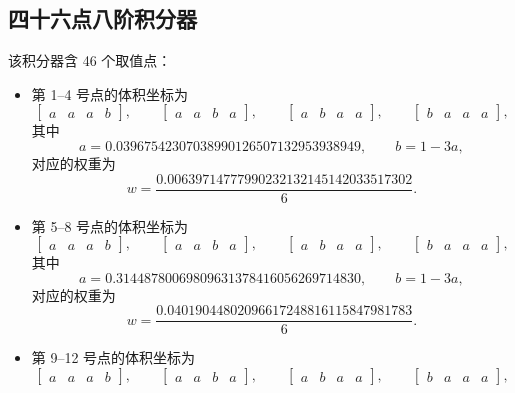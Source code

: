\subsection{四十六点八阶积分器}

该积分器含 46 个取值点：
\begin{itemize}[wide]
\item 第 1–4 号点的体积坐标为
\begin{equation}
\begin{bmatrix}a & a & a & b\end{bmatrix},\qquad\begin{bmatrix}a & a & b & a\end{bmatrix},\qquad\begin{bmatrix}a & b & a & a\end{bmatrix},\qquad\begin{bmatrix}b & a & a & a\end{bmatrix},
\end{equation}
其中
\begin{equation}
a=0.03967542307038990126507132953938949,\qquad b=1-3a,
\end{equation}
对应的权重为
\begin{equation}
w=\frac{0.00639714777990232132145142033517302}{6}.
\end{equation}
\item 第 5–8 号点的体积坐标为
\begin{equation}
\begin{bmatrix}a & a & a & b\end{bmatrix},\qquad\begin{bmatrix}a & a & b & a\end{bmatrix},\qquad\begin{bmatrix}a & b & a & a\end{bmatrix},\qquad\begin{bmatrix}b & a & a & a\end{bmatrix},
\end{equation}
其中
\begin{equation}
a=0.31448780069809631378416056269714830,\qquad b=1-3a,
\end{equation}
对应的权重为
\begin{equation}
w=\frac{0.04019044802096617248816115847981783}{6}.
\end{equation}
\item 第 9–12 号点的体积坐标为
\begin{equation}
\begin{bmatrix}a & a & a & b\end{bmatrix},\qquad\begin{bmatrix}a & a & b & a\end{bmatrix},\qquad\begin{bmatrix}a & b & a & a\end{bmatrix},\qquad\begin{bmatrix}b & a & a & a\end{bmatrix},

\end{equation}
\end{itemize}
